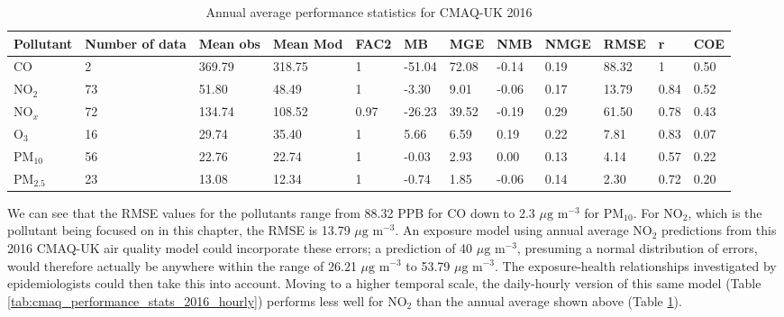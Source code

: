 \begin{table}[H]
\scriptsize
\centering
\begin{tabular}{|p{1cm}|p{1cm}|p{0.8cm}|p{1cm}|p{0.6cm}|p{1cm}|p{1cm}|p{0.8cm}|p{0.8cm}|p{0.8cm}|p{0.6cm}|p{0.7cm}|}
\hline
\textbf{Pollutant} & \textbf{Number of data} & \textbf{Mean obs} & \textbf{Mean Mod} & \textbf{FAC2} & \textbf{MB} & \textbf{MGE} & \textbf{NMB} & \textbf{NMGE} & \textbf{RMSE} & \textbf{r} & \textbf{COE} \\ \hline
CO         & 2  & 369.79 & 318.75 & 1    & -51.04 & 72.08 & -0.14 & 0.19 & 88.32 & 1    & 0.50  \\ \hline
NO$_{2}$   & 73 & 51.80  & 48.49  & 1    & -3.30  & 9.01  & -0.06 & 0.17 & 13.79 & 0.84 & 0.52  \\ \hline
NO$_{x}$   & 72 & 134.74 & 108.52 & 0.97 & -26.23 & 39.52 & -0.19 & 0.29 & 61.50 & 0.78 & 0.43  \\ \hline
O$_{3}$    & 16 & 29.74  & 35.40  & 1    & 5.66   & 6.59  & 0.19  & 0.22 & 7.81  & 0.83 & 0.07  \\ \hline
PM$_{10}$  & 56 & 22.76  & 22.74  & 1    & -0.03  & 2.93  & 0.00  & 0.13 & 4.14  & 0.57 & 0.22  \\ \hline
PM$_{2.5}$ & 23 & 13.08  & 12.34  & 1    & -0.74  & 1.85  & -0.06 & 0.14 & 2.30  & 0.72 & 0.20  \\ \hline
\end{tabular}
\caption{Annual average performance statistics for CMAQ-UK 2016}
\label{tab:cmaq_performance_stats_2016}
\end{table}

We can see that the RMSE values for the pollutants range from 88.32 PPB for CO down to 2.3 $\mu \text{g m}^{-3}$ for PM$_{10}$. For NO$_{2}$, which is the pollutant being focused on in this chapter, the RMSE is 13.79 $\mu \text{g m}^{-3}$. An exposure model using annual average NO$_{2}$ predictions from this 2016 CMAQ-UK air quality model could incorporate these errors; a prediction of 40 $\mu \text{g m}^{-3}$, presuming a normal distribution of errors, would therefore actually be anywhere within the range of 26.21 $\mu \text{g m}^{-3}$ to 53.79 $\mu \text{g m}^{-3}$. The exposure-health relationships investigated by epidemiologists could then take this into account. Moving to a higher temporal scale, the daily-hourly version of this same model (Table \ref{tab:cmaq_performance_stats_2016_hourly}) performs less well for NO$_{2}$ than the annual average shown above (Table \ref{tab:cmaq_performance_stats_2016}).

